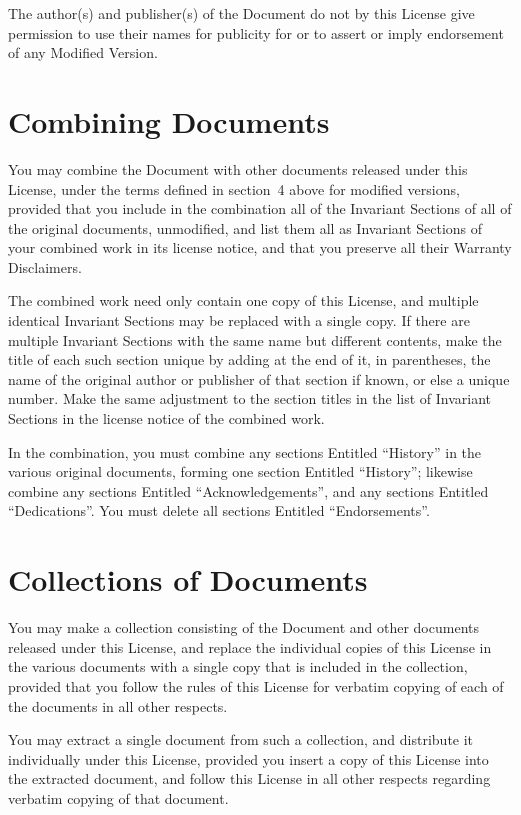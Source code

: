 The author(s) and publisher(s) of the Document do not by this License
give permission to use their names for publicity for or to assert or
imply endorsement of any Modified Version.


\section{Combining Documents}


You may combine the Document with other documents released under this
License, under the terms defined in section~4 above for modified
versions, provided that you include in the combination all of the
Invariant Sections of all of the original documents, unmodified, and
list them all as Invariant Sections of your combined work in its
license notice, and that you preserve all their Warranty Disclaimers.

The combined work need only contain one copy of this License, and
multiple identical Invariant Sections may be replaced with a single
copy.  If there are multiple Invariant Sections with the same name but
different contents, make the title of each such section unique by
adding at the end of it, in parentheses, the name of the original
author or publisher of that section if known, or else a unique number.
Make the same adjustment to the section titles in the list of
Invariant Sections in the license notice of the combined work.

In the combination, you must combine any sections Entitled ``History''
in the various original documents, forming one section Entitled
``History''; likewise combine any sections Entitled ``Acknowledgements'',
and any sections Entitled ``Dedications''.  You must delete all sections
Entitled ``Endorsements''.

\section{Collections of Documents}

You may make a collection consisting of the Document and other documents
released under this License, and replace the individual copies of this
License in the various documents with a single copy that is included in
the collection, provided that you follow the rules of this License for
verbatim copying of each of the documents in all other respects.

You may extract a single document from such a collection, and distribute
it individually under this License, provided you insert a copy of this
License into the extracted document, and follow this License in all
other respects regarding verbatim copying of that document.

